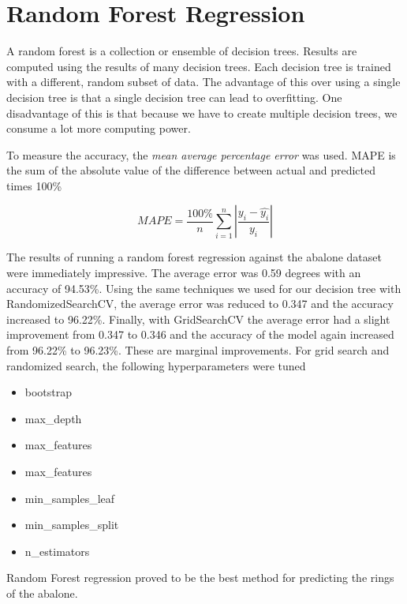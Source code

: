 \section{Random Forest Regression}

A random forest is a collection or ensemble of decision trees. Results are computed using the results of many decision trees. Each decision tree is trained with a different, random subset of data. The advantage of this over using a single decision tree is that a single decision tree can lead to overfitting. One disadvantage of this is that because we have to create multiple decision trees, we consume a lot more computing power.

To measure the accuracy, the \textit{mean average percentage error} was used. MAPE is the sum of the absolute value of the difference between actual and predicted times 100\%

\begin{equation}\label{eq_mape}
MAPE = \frac{100\%}{n}\sum\limits_{i=1}^n\left|\frac{y_i-\hat{y_i}}{y_i} \right|
\end{equation}

The results of running a random forest regression against the abalone dataset were immediately impressive. The average error was 0.59 degrees with an accuracy of 94.53\%. Using the same techniques we used for our decision tree with RandomizedSearchCV, the average error was reduced to 0.347 and the accuracy increased to 96.22\%. Finally, with GridSearchCV the average error had a slight improvement from 0.347 to 0.346 and the accuracy of the model again increased from 96.22\% to 96.23\%. These are marginal improvements. For grid search and randomized search, the following hyperparameters were tuned

\begin{itemize}
  \item bootstrap
  \item max\_depth
  \item max\_features
  \item max\_features
  \item min\_samples\_leaf
  \item min\_samples\_split
  \item n\_estimators
\end{itemize}

Random Forest regression proved to be the best method for predicting the rings of the abalone.

